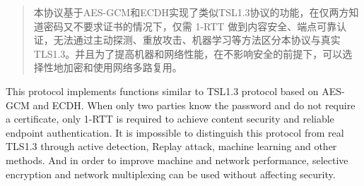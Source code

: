 

\begin{abstract}
	本协议基于AES-GCM和ECDH实现了类似TSL1.3协议的功能，在仅两方知道密码又不要求证书的情况下，仅需 1-RTT 做到内容安全、端点可靠认证，无法通过主动探测、重放攻击、机器学习等方法区分本协议与真实TLS1.3。并且为了提高机器和网络性能，在不影响安全的前提下，可以选择性地加密和使用网络多路复用。

\end{abstract}

\begin{abstract*}
	This protocol implements functions similar to TSL1.3 protocol based on AES-GCM and ECDH. When only two parties know the password and do not require a certificate, only 1-RTT is required to achieve content security and reliable endpoint authentication. It is impossible to distinguish this protocol from real TLS1.3 through active detection, Replay attack, machine learning and other methods. And in order to improve machine and network performance, selective encryption and network multiplexing can be used without affecting security.

\end{abstract*}
